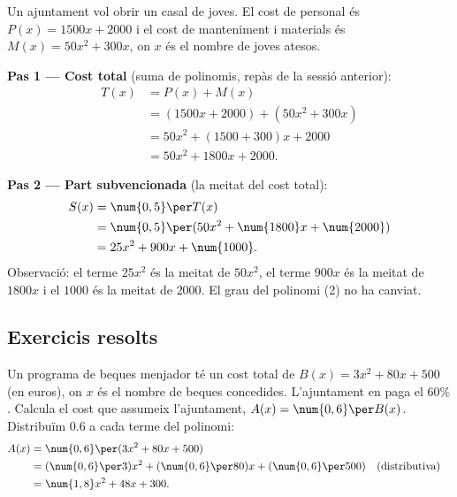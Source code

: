 \begin{exemple}
Un ajuntament vol obrir un casal de joves. El cost de personal és
$P(x) = \num{1500}x + \num{2000}$ i el cost de manteniment i materials és
$M(x) = 50x^2 + 300x$, on $x$ és el nombre de joves atesos.

\medskip
\textbf{Pas 1 — Cost total} (suma de polinomis, repàs de la sessió anterior):
\begin{align*}
T(x) &= P(x) + M(x) \\
     &= (\num{1500}x + \num{2000}) + (50x^2 + 300x) \\
     &= 50x^2 + (\num{1500}+300)x + \num{2000} \\
     &= 50x^2 + \num{1800}x + \num{2000}.
\end{align*}

\textbf{Pas 2 — Part subvencionada} (la meitat del cost total):
\begin{align*}
S(x) &= \num{0,5}\per T(x) \\
     &= \num{0,5}\per(50x^2 + \num{1800}x + \num{2000}) \\
     &= 25x^2 + 900x + \num{1000}.
\end{align*}
Observació: el terme $25x^2$ és la meitat de $50x^2$, el terme $900x$ és la
meitat de $\num{1800}x$ i el $\num{1000}$ és la meitat de $\num{2000}$. El
grau del polinomi (2) no ha canviat.
\end{exemple}

\subsection{Exercicis resolts}

\begin{exresolt}
Un programa de beques menjador té un cost total de
$B(x) = 3x^2 + 80x + 500$ (en euros), on $x$ és el nombre de
beques concedides. L'ajuntament en paga el $60\%$.
Calcula el cost que assumeix l'ajuntament, $A(x) = \num{0,6}\per B(x)$.
\solucio
Distribuïm $\num{0,6}$ a cada terme del polinomi:
\begin{align*}
A(x) &= \num{0,6}\per(3x^2 + 80x + 500) \\
     &= (\num{0,6}\per 3)x^2 + (\num{0,6}\per 80)x + (\num{0,6}\per 500)
       &&\text{(distributiva)} \\
     &= \num{1,8}x^2 + 48x + 300.
\end{align*}
\end{exresolt}

